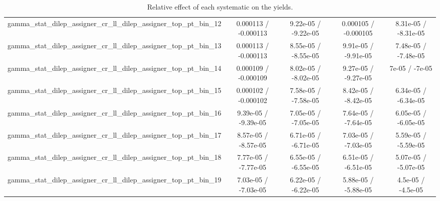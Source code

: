 \documentclass[10pt]{article}
\begin{document}
\begin{table}[htbp]
\begin{center}
\begin{tabular}{|c|c|c|c|c|}
  gamma_stat_dilep_assigner_cr_ll_dilep_assigner_top_pt_bin_12 & 0.000113 / -0.000113 & 9.22e-05 / -9.22e-05 & 0.000105 / -0.000105 & 8.31e-05 / -8.31e-05 \\ 
  gamma_stat_dilep_assigner_cr_ll_dilep_assigner_top_pt_bin_13 & 0.000113 / -0.000113 & 8.55e-05 / -8.55e-05 & 9.91e-05 / -9.91e-05 & 7.48e-05 / -7.48e-05 \\ 
  gamma_stat_dilep_assigner_cr_ll_dilep_assigner_top_pt_bin_14 & 0.000109 / -0.000109 & 8.02e-05 / -8.02e-05 & 9.27e-05 / -9.27e-05 & 7e-05 / -7e-05 \\ 
  gamma_stat_dilep_assigner_cr_ll_dilep_assigner_top_pt_bin_15 & 0.000102 / -0.000102 & 7.58e-05 / -7.58e-05 & 8.42e-05 / -8.42e-05 & 6.34e-05 / -6.34e-05 \\ 
  gamma_stat_dilep_assigner_cr_ll_dilep_assigner_top_pt_bin_16 & 9.39e-05 / -9.39e-05 & 7.05e-05 / -7.05e-05 & 7.64e-05 / -7.64e-05 & 6.05e-05 / -6.05e-05 \\ 
  gamma_stat_dilep_assigner_cr_ll_dilep_assigner_top_pt_bin_17 & 8.57e-05 / -8.57e-05 & 6.71e-05 / -6.71e-05 & 7.03e-05 / -7.03e-05 & 5.59e-05 / -5.59e-05 \\ 
  gamma_stat_dilep_assigner_cr_ll_dilep_assigner_top_pt_bin_18 & 7.77e-05 / -7.77e-05 & 6.55e-05 / -6.55e-05 & 6.51e-05 / -6.51e-05 & 5.07e-05 / -5.07e-05 \\ 
  gamma_stat_dilep_assigner_cr_ll_dilep_assigner_top_pt_bin_19 & 7.03e-05 / -7.03e-05 & 6.22e-05 / -6.22e-05 & 5.88e-05 / -5.88e-05 & 4.5e-05 / -4.5e-05 \\ 
\hline 
\end{tabular} 
\caption{Relative effect of each systematic on the yields.} 
\end{center} 
\end{table} 
\end{document}
